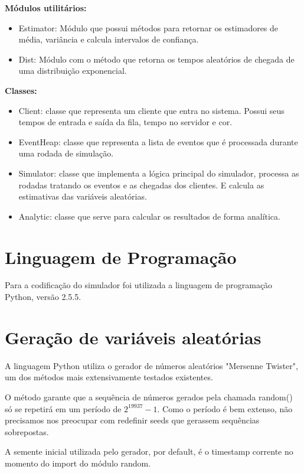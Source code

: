 \textbf{Módulos utilitários:}

\begin{itemize}
  \item Estimator: Módulo que possui métodos para retornar os estimadores de média, variância e calcula intervalos de confiança.
  \item Dist: Módulo com o método que retorna os tempos aleatórios de chegada de uma distribuição exponencial.
\end{itemize}

\textbf{Classes:}

\begin{itemize}
  \item Client: classe que representa um cliente que entra no sistema. Possui seus tempos de entrada e saída da fila, tempo no servidor e cor.
  \item EventHeap: classe que representa a lista de eventos que é processada durante uma rodada de simulação.
  \item Simulator: classe que implementa a lógica principal do simulador, processa as rodadas tratando os eventos e as chegadas dos clientes. E calcula as estimativas das variáveis aleatórias.
  \item Analytic: classe que serve para calcular os resultados de forma analítica.
\end{itemize}

\section{Linguagem de Programação}
Para a codificação do simulador foi utilizada a linguagem de programação Python, versão 2.5.5.

\section{Geração de variáveis aleatórias}
\label{sec:random}
A linguagem Python utiliza o gerador de números aleatórios "Mersenne Twister", um dos métodos mais extensivamente testados existentes. 

O método garante que a sequência de números gerados pela chamada random() só se repetirá em um período de $2^{19937}-1$. Como o período é bem extenso, não precisamos nos preocupar com redefinir seeds que gerassem sequências sobrepostas.

A semente inicial utilizada pelo gerador, por default, é o timestamp corrente no momento do import do módulo random.

